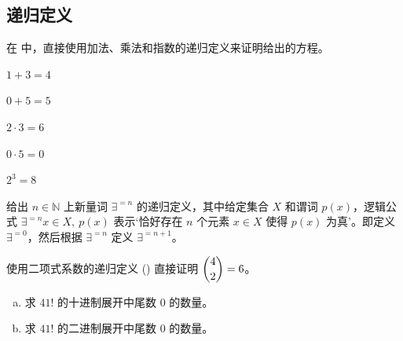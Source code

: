 \subsection*{递归定义}

在  中，直接使用加法、乘法和指数的递归定义来证明给出的方程。

\begin{chapex}
\label{cqRecursiveDefinitionsOfArithmeticOperationsBegin}
$1+3=4$
\end{chapex}

\begin{chapex}
$0+5=5$
\end{chapex}

\begin{chapex}
$2 \cdot 3 = 6$
\end{chapex}

\begin{chapex}
$0 \cdot 5 = 0$
\end{chapex}

\begin{chapex}
\label{cqRecursiveDefinitionsOfArithmeticOperationsEnd}
$2^3=8$
\end{chapex}

\begin{chapex}
给出 $n \in \mathbb{N}$ 上新量词 $\exists^{=n}$ 的递归定义，其中给定集合 $X$ 和谓词 $p(x)$，逻辑公式 $\exists^{=n} x \in X,~ p(x)$ 表示`恰好存在 $n$ 个元素 $x \in X$ 使得 $p(x)$ 为真'。即定义 $\exists^{=0}$，然后根据 $\exists^{=n}$ 定义 $\exists^{=n+1}$。
\end{chapex}

\begin{chapex}
使用二项式系数的递归定义 () 直接证明 $\dbinom{4}{2} = 6$。
\end{chapex}

\begin{chapex}
\begin{enumerate}[(a)]
\item 求 $41!$ 的十进制展开中尾数 $0$ 的数量。
\item 求 $41!$ 的二进制展开中尾数 $0$ 的数量。
\end{enumerate}
\end{chapex}

